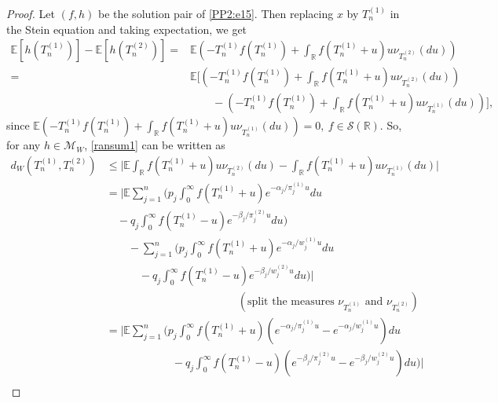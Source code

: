 \documentclass[12pt, a4paper,reqno]{amsart}
\theoremstyle{definition}
\theoremstyle{myremark}
\numberwithin{equation}{section}
\begin{document}
 \begin{proof}
 	Let $(f,h)$ be the solution pair of \eqref{PP2:e15}. Then replacing $x$ by $T_n^{(1)} $ in the Stein equation and taking expectation, we get	
 	\begin{align}\label{ransum1}
 	\nonumber	\mathbb{E}[h(T_n^{(1)})]-\mathbb{E}[h(T_n^{(2)})]=&\mathbb{E}\left(-T_n^{(1)}f(T_n^{(1)})+\displaystyle\int_{\mathbb{R}}f(T_n^{(1)}+u)u\nu_{T_n^{(2)}}(du)  \right)\\
 \nonumber	=&\mathbb{E}\bigg[\left(-T_n^{(1)}f(T_n^{(1)})+\displaystyle\int_{\mathbb{R}}f(T_n^{(1)}+u)u\nu_{T_n^{(2)}}(du)  \right)\\
 	&\quad\quad-\left(-T_n^{(1)}f(T_n^{(1)})+\displaystyle\int_{\mathbb{R}}f(T_n^{(1)}+u)u\nu_{T_n^{(1)}}(du)  \right)\bigg],
 	\end{align}
 	\noindent
 	since $\mathbb{E}\left(-T_n^{(1)}f(T_n^{(1)})+\displaystyle\int_{\mathbb{R}}f(T_n^{(1)}+u)u\nu_{T_n^{(1)}}(du)  \right)=0, ~f\in\mathcal{S}(\mathbb{{R}}).$ So, for any $h\in \mathcal{M}_W$, \eqref{ransum1} can be written as
 	\begin{align}\label{2ransum}
 		\nonumber d_W(T_n^{(1)},T_n^{(2)}) &\leq \bigg|\mathbb{E}\displaystyle\int_{\mathbb{R}}f(T_n^{(1)}+u)u\nu_{T_n^{(2)}}(du)  -\displaystyle\int_{\mathbb{R}}f(T_n^{(1)}+u)u\nu_{T_n^{(1)}}(du)  \bigg|\\
 		\nonumber &=\bigg|\mathbb{E}\sum_{j=1}^{n}\bigg(p_j\displaystyle\int_{0}^{\infty}f(T_n^{(1)}+u)e^{-\alpha_j/\pi_{j}^{(1)} u}du\\
 		\nonumber &\quad - q_j\displaystyle\int_{0}^{\infty}f(T_n^{(1)}-u)e^{-\beta_j/\pi_{j}^{(2)} u}du\bigg)\\
 		\nonumber &\quad\quad -\sum_{j=1}^{n}\bigg(p_j\displaystyle\int_{0}^{\infty}f(T_n^{(1)}+u)e^{-\alpha_j/w_{j}^{(1)} u}du\\
 		\nonumber &\quad\quad\quad - q_j\displaystyle\int_{0}^{\infty}f(T_n^{(1)}-u)e^{-\beta_j/w_{j}^{(2)} u}du\bigg) \bigg|\\
 		\nonumber &\quad\quad\quad\quad\quad\quad\quad\quad\quad\quad\quad\quad(\text{split the measures } \nu_{T_n^{(1)}} \text{ and } \nu_{T_n^{(2)}})\\
 		\nonumber &=\bigg|\mathbb{E} \sum_{j=1}^{n}\bigg(p_j\displaystyle\int_{0}^{\infty}f(T_n^{(1)}+u)\left(e^{-\alpha_j/\pi_{j}^{(1)} u}-e^{-\alpha_j/w_{j}^{(1)} u}\right)du\\
 		\nonumber &\quad\quad\quad\quad\quad\quad-q_j\displaystyle\int_{0}^{\infty}f(T_n^{(1)}-u)\left(e^{-\beta_j/\pi_{j}^{(2)} u}-e^{-\beta_j/w_{j}^{(2)} u}\right)du\bigg) \bigg|\\

\end{align}
\end{proof}
\end{document}

